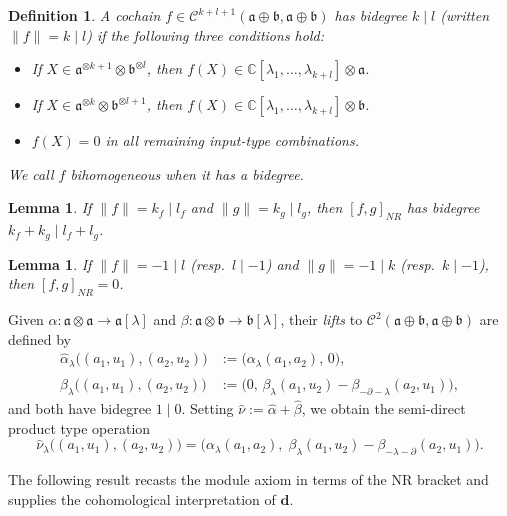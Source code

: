 \documentclass[a4paper,11pt]{article}
\def\Vs{\mathfrak{a}}
\def\Ws{\mathfrak{b}}
\def\Cch{\mathscr{C}}
\def\la{\lambda}
\def\p{\partial}
\def\C{\mathbb{C}}
\newcommand{\dM}{\mathbf{d}}
\numberwithin{equation}{section}
\newtheorem{definition}[theorem]{Definition}
\newtheorem{lemma}[theorem]{Lemma}
\begin{document}
\begin{definition}\label{def:bidegree}
A cochain $f\in\Cch^{k+l+1}(\Vs\oplus\Ws,\Vs\oplus\Ws)$ has
\textit{bidegree} $k\mid l$ (written $\|f\|=k\mid l$) if the following
three conditions hold:
\begin{itemize}
  \item[\rm(i)] If $X\in\Vs^{\otimes k+1}\otimes\Ws^{\otimes l}$,
    then $f(X)\in\C[\la_1,\ldots,\la_{k+l}]\otimes\Vs$.
  \item[\rm(ii)] If $X\in\Vs^{\otimes k}\otimes\Ws^{\otimes l+1}$,
    then $f(X)\in\C[\la_1,\ldots,\la_{k+l}]\otimes\Ws$.
  \item[\rm(iii)] $f(X)=0$ in all remaining input-type combinations.
\end{itemize}
We call $f$ \textit{bihomogeneous} when it has a bidegree.
\end{definition}

\begin{lemma}\label{lem:FN-bigrade}
  If $\|f\|=k_f\mid l_f$ and $\|g\|=k_g\mid l_g$, then
  $[f,g]_{NR}$ has bidegree $k_f+k_g\mid l_f+l_g$.
\end{lemma}

\begin{lemma}\label{lem:FN-zero}
  If $\|f\|=-1\mid l$ (resp.\ $l\mid-1$) and $\|g\|=-1\mid k$
  (resp.\ $k\mid-1$), then $[f,g]_{NR} = 0$.
\end{lemma}


Given $\alpha:\Vs\otimes\Vs\to\Vs[\lambda]$ and
$\beta:\Vs\otimes\Ws\to\Ws[\lambda]$, their \textit{lifts} to
$\Cch^2(\Vs\oplus\Ws,\Vs\oplus\Ws)$ are defined by
\begin{align}
  \widehat\alpha_\la\bigl((a_1,u_1),(a_2,u_2)\bigr)
  &:= \bigl(\alpha_\la(a_1,a_2),\,0\bigr), \label{eq:lift-a}\\
  \widehat\beta_\la\bigl((a_1,u_1),(a_2,u_2)\bigr)
  &:= \bigl(0,\,\beta_\la(a_1,u_2)-\beta_{-\p-\la}(a_2,u_1)\bigr),
  \label{eq:lift-b}
\end{align}
and both have bidegree $1\mid 0$.  Setting $\widehat\nu := \widehat\alpha+\widehat\beta$,
we obtain the semi-direct product type operation
\begin{equation}\label{eq:nu-hat}
  \widehat\nu_\la\bigl((a_1,u_1),(a_2,u_2)\bigr)
  = \bigl(\alpha_\la(a_1,a_2),\;
           \beta_\la(a_1,u_2)-\beta_{-\la-\p}(a_2,u_1)\bigr).
\end{equation}

The following result recasts the module axiom in terms of the 
NR bracket
and supplies the cohomological interpretation of $\dM$.
\end{document}
